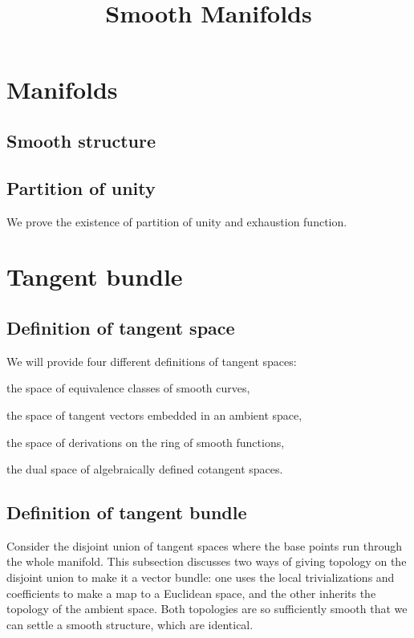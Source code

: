 \documentclass{../exp}
\title{Smooth Manifolds}
\begin{document}
\maketitle
\tableofcontents

\section{Manifolds}
\subsection{Smooth structure}


\subsection{Partition of unity}
We prove the existence of partition of unity and exhaustion function.








\section{Tangent bundle}

\subsection{Definition of tangent space}
We will provide four different definitions of tangent spaces:
\begin{cond}
\item the space of equivalence classes of smooth curves,
\item the space of tangent vectors embedded in an ambient space,
\item the space of derivations on the ring of smooth functions,
\item the dual space of algebraically defined cotangent spaces.
\end{cond}


\subsection{Definition of tangent bundle}
Consider the disjoint union of tangent spaces where the base points run through the whole manifold.
This subsection discusses two ways of giving topology on the disjoint union to make it a vector bundle: one uses the local trivializations and coefficients to make a map to a Euclidean space, and the other inherits the topology of the ambient space.
Both topologies are so sufficiently smooth that we can settle a smooth structure, which are identical.
\end{document}
